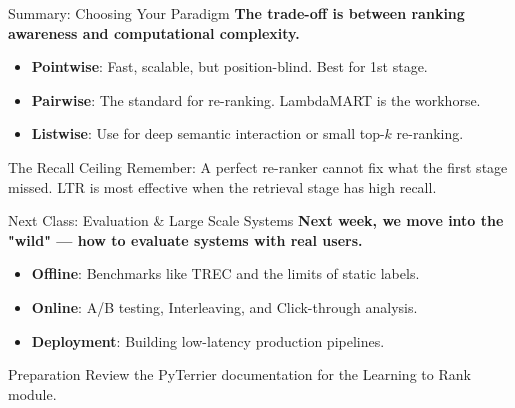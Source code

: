 \documentclass[aspectratio=169]{beamer}
\newif\ifanimated
\newcommand{\cpause}{\ifanimated\pause\fi}
\begin{document}
\begin{frame}{Summary: Choosing Your Paradigm}
\textbf{The trade-off is between ranking awareness and computational complexity.}

\vspace{0.8em}
\begin{itemize}
    \item \textbf{Pointwise}: Fast, scalable, but position-blind. Best for 1st stage.
    \item \textbf{Pairwise}: The standard for re-ranking. LambdaMART is the workhorse.
    \item \textbf{Listwise}: Use for deep semantic interaction or small top-$k$ re-ranking.
\end{itemize}\cpause

\vspace{1em}
\cpause
\begin{alertblock}{The Recall Ceiling}
Remember: A perfect re-ranker cannot fix what the first stage missed. LTR is most effective when the retrieval stage has high recall.
\end{alertblock}
\end{frame}

\begin{frame}{Next Class: Evaluation \& Large Scale Systems}
\textbf{Next week, we move into the "wild" --- how to evaluate systems with real users.}

\vspace{0.8em}
\begin{itemize}
    \item \textbf{Offline}: Benchmarks like TREC and the limits of static labels.
    \item \textbf{Online}: A/B testing, Interleaving, and Click-through analysis.
    \item \textbf{Deployment}: Building low-latency production pipelines.
\end{itemize}\cpause

\vspace{1em}
\cpause
\begin{block}{Preparation}
Review the PyTerrier documentation for the Learning to Rank module.
\end{block}
\end{frame}
\end{document}

